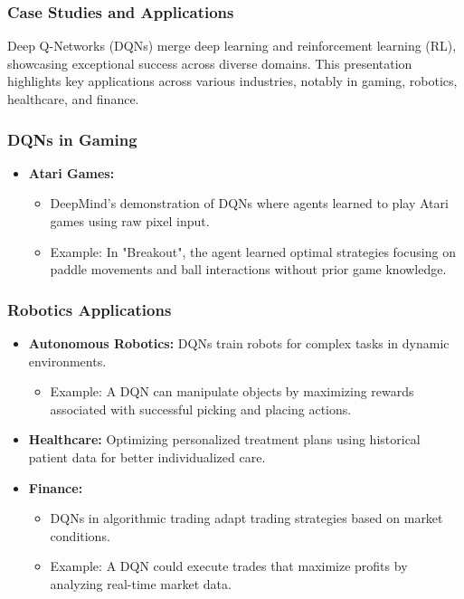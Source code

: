 \documentclass[aspectratio=169]{beamer}
\begin{document}
\begin{frame}[fragile]
    \frametitle{Case Studies and Applications}
    Deep Q-Networks (DQNs) merge deep learning and reinforcement learning (RL), showcasing exceptional success across diverse domains. This presentation highlights key applications across various industries, notably in gaming, robotics, healthcare, and finance.
\end{frame}

\begin{frame}[fragile]
    \frametitle{DQNs in Gaming}
    \begin{itemize}
        \item \textbf{Atari Games:} 
        \begin{itemize}
            \item DeepMind's demonstration of DQNs where agents learned to play Atari games using raw pixel input.
            \item Example: In "Breakout", the agent learned optimal strategies focusing on paddle movements and ball interactions without prior game knowledge.
        \end{itemize}
    \end{itemize}
\end{frame}

\begin{frame}[fragile]
    \frametitle{Robotics Applications}
    \begin{itemize}
        \item \textbf{Autonomous Robotics:} DQNs train robots for complex tasks in dynamic environments.
        \begin{itemize}
            \item Example: A DQN can manipulate objects by maximizing rewards associated with successful picking and placing actions.
        \end{itemize}
        
        \item \textbf{Healthcare:} Optimizing personalized treatment plans using historical patient data for better individualized care.
        
        \item \textbf{Finance:} 
        \begin{itemize}
            \item DQNs in algorithmic trading adapt trading strategies based on market conditions.
            \item Example: A DQN could execute trades that maximize profits by analyzing real-time market data.
        \end{itemize}
    \end{itemize}
\end{frame}
\end{document}
